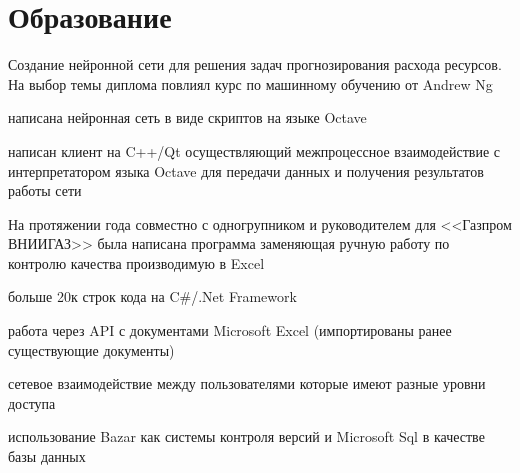 \documentclass[a4paper]{curricula-vitae}
\begin{document}
\begin{minipage}[t]{0.66\textwidth}
\section{Образование} 

Создание нейронной сети для решения задач прогнозирования расхода ресурсов. 
На выбор темы диплома повлиял курс по машинному обучению от Andrew Ng
\begin{tightitemize}
\item написана нейронная сеть в виде скриптов на языке Octave
\item написан клиент на C++/Qt осуществляющий межпроцессное взаимодействие с интерпретатором 
языка Octave для передачи данных и получения результатов работы сети
\end{tightitemize}

\insertspace

На протяжении года совместно с одногрупником и руководителем для <<Газпром ВНИИГАЗ>> была написана
программа заменяющая ручную работу по контролю качества производимую в Excel
\begin{tightitemize}
\item больше 20к строк кода на C\#/.Net Framework
\item работа через API с документами Microsoft Excel (импортированы ранее существующие документы)
\item сетевое взаимодействие между пользователями которые имеют разные уровни доступа
\item использование Bazar как системы контроля версий и Microsoft Sql в качестве базы данных
\end{tightitemize}

\insertspace

\end{minipage}

\end{document}
